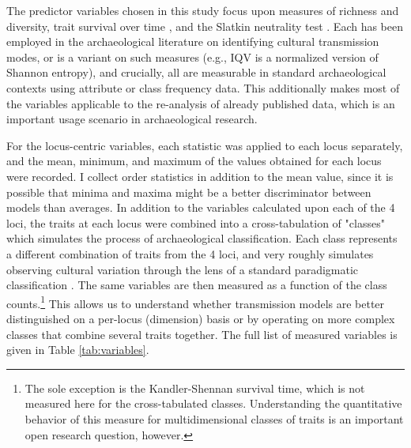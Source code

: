 The predictor variables chosen in this study focus upon measures of richness and
diversity, trait survival over time \citep{kandler2013non}, and the
Slatkin neutrality test \citep{slatkin1996correction, slatkin1994exact}.
Each has been employed in the archaeological literature on identifying
cultural transmission modes, or is a variant on such measures (e.g., IQV
is a normalized version of Shannon entropy), and crucially, all are measurable in standard archaeological contexts using attribute or class frequency data.  This additionally makes most of the variables applicable to the re-analysis of already published data, which is an important usage scenario in archaeological research.   

For the locus-centric variables, each statistic was applied to each
locus separately, and the mean, minimum, and maximum of the values
obtained for each locus were recorded. I collect order statistics
in addition to the mean value, since it is possible that minima and
maxima might be a better discriminator between models than averages. In
addition to the variables calculated upon each of the 4 loci, the traits
at each locus were combined into a cross-tabulation of "classes" which simulates the
process of archaeological classification. Each class represents a
different combination of traits from the 4 loci, and very roughly
simulates observing cultural variation through the lens of a standard
paradigmatic classification \citep{Dunnell1971}. The same variables are
then measured as a function of the class counts.\footnote{The sole exception is the Kandler-Shennan survival time, which is not measured here for the cross-tabulated classes.  Understanding the quantitative behavior of this measure for multidimensional classes of traits is an important open research question, however.} This allows us to
understand whether transmission models are better distinguished on a
per-locus (dimension) basis or by operating on more complex classes that
combine several traits together. The full list of measured variables is
given in Table \ref{tab:variables}.


